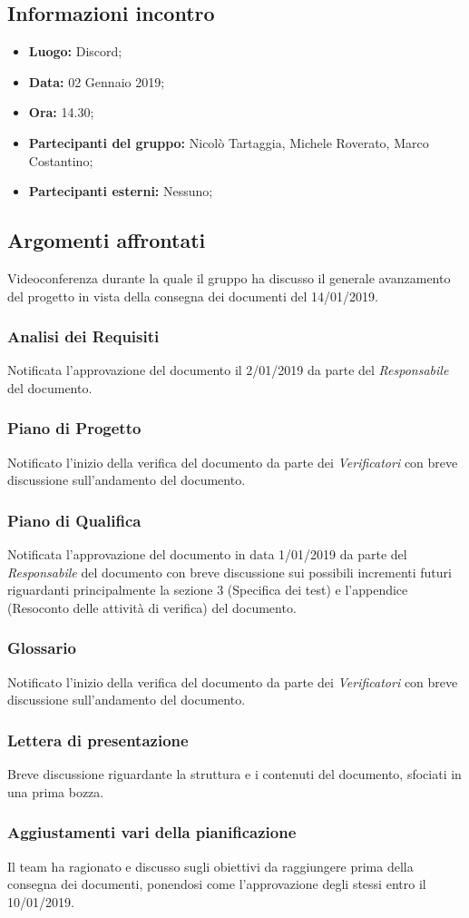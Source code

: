 \subsection{Informazioni incontro}
\begin{itemize}
	\item { \textbf{Luogo:} Discord;  }
	\item { \textbf{Data:} 02 Gennaio 2019; }
	\item { \textbf{Ora:} 14.30; }
	\item { \textbf{Partecipanti del gruppo:} Nicolò Tartaggia, Michele Roverato, Marco Costantino;}
	\item { \textbf{Partecipanti esterni:} Nessuno; }
\end{itemize}


\subsection{Argomenti affrontati}
Videoconferenza durante la quale il gruppo ha discusso il generale avanzamento del progetto in vista della consegna dei documenti del 14/01/2019.

\subsubsection{Analisi dei Requisiti}
Notificata l'approvazione del documento il 2/01/2019 da parte del \emph{Responsabile} del documento.
\subsubsection{Piano di Progetto}
Notificato l'inizio della verifica del documento da parte dei \emph{Verificatori} con breve discussione sull'andamento del documento.
\subsubsection{Piano di Qualifica}
Notificata l'approvazione del documento in data 1/01/2019 da parte del \emph{Responsabile} del documento con breve discussione sui possibili incrementi futuri riguardanti principalmente la sezione 3 (Specifica dei test) e l'appendice (Resoconto delle attività di verifica) del documento.
\subsubsection{Glossario}
Notificato l'inizio della verifica del documento da parte dei \emph{Verificatori} con breve discussione sull'andamento del documento.
\subsubsection{Lettera di presentazione}
Breve discussione riguardante la struttura e i contenuti del documento, sfociati in una prima bozza.
\subsubsection{Aggiustamenti vari della pianificazione}
Il team ha ragionato e discusso sugli obiettivi da raggiungere prima della consegna dei documenti, ponendosi come  l'approvazione degli stessi entro il 10/01/2019. 
